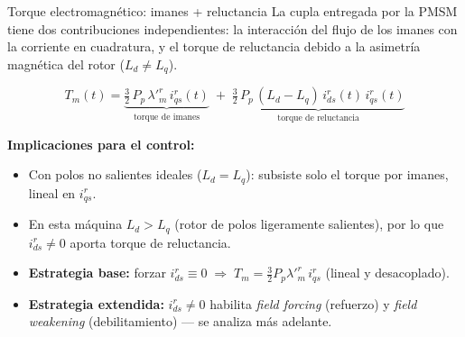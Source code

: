 \documentclass[aspectratio=169,t]{beamer}
\begin{document}
\begin{frame}{Torque electromagnético: imanes + reluctancia}
{\small\color{uncGray}La cupla entregada por la PMSM tiene dos contribuciones independientes: la interacción del flujo de los imanes con la corriente en cuadratura, y el torque de reluctancia debido a la asimetría magnética del rotor ($L_d\neq L_q$).}\par
\vspace{8mm}

\begin{equation*}
\boxed{\;\;
T_m(t) = \underbrace{\tfrac{3}{2}\,P_p\,\lambda'^r_m\,i^{r}_{qs}(t)}_{\text{torque de imanes}} \;+\; \underbrace{\tfrac{3}{2}\,P_p\,(L_d - L_q)\,i^{r}_{ds}(t)\,i^{r}_{qs}(t)}_{\text{torque de reluctancia}}
\;\;}
\end{equation*}

\vspace{8mm}
\textbf{Implicaciones para el control:}
\begin{itemize}\small
\item Con polos no salientes ideales ($L_d=L_q$): subsiste solo el torque por imanes, lineal en $i^{r}_{qs}$.
\item En esta máquina $L_d>L_q$ (rotor de polos ligeramente salientes), por lo que $i^{r}_{ds}\neq 0$ aporta torque de reluctancia.
\item \textbf{Estrategia base:} forzar $i^{r}_{ds}\equiv 0 \;\Rightarrow\; T_m = \tfrac{3}{2}P_p\lambda'^r_m\,i^{r}_{qs}$ (lineal y desacoplado).
\item \textbf{Estrategia extendida:} $i^{r}_{ds}\neq 0$ habilita \emph{field forcing} (refuerzo) y \emph{field weakening} (debilitamiento) — se analiza más adelante.
\end{itemize}
\end{frame}

\end{document}
